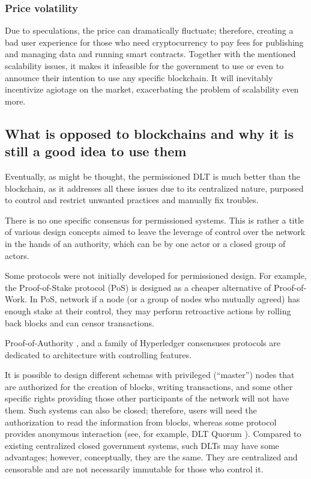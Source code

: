 \begin{multicols}{2}
\subsubsection{Price volatility}

Due to speculations, the price can dramatically fluctuate; therefore, creating a bad user experience for those who need cryptocurrency to pay fees for publishing and managing data and running smart contracts. Together with the mentioned scalability issues, it makes it infeasible for the government to use or even to announce their intention to use any specific blockchain. It will inevitably incentivize agiotage on the market, exacerbating the problem of scalability even more.

\subsection{What is opposed to blockchains and why it is still a good idea to use them}

Eventually, as might be thought, the permissioned DLT is much better than the blockchain, as it addresses all these issues due to its centralized nature, purposed to control and restrict unwanted practices and manually fix troubles.

There is no one specific consensus for permissioned systems. This is rather a title of various design concepts aimed to leave the leverage of control over the network in the hands of an authority, which can be by one actor or a closed group of actors.

Some protocols were not initially developed for permissioned design. For example, the Proof-of-Stake protocol (PoS) \cite{art1-key20} is designed as a cheaper alternative of Proof-of-Work. In PoS, network if a node (or a group of nodes who mutually agreed) has enough stake at their control, they may perform retroactive actions by rolling back blocks \cite{art1-key21} and can censor transactions.

Proof-of-Authority \cite{art1-key22}, and a family of Hyperledger consensuses \cite{art1-key23} protocols are dedicated to architecture with controlling features.

It is possible to design different schemas with privileged (“master”) nodes that are authorized for the creation of blocks, writing transactions, and some other specific rights providing those other participants of the network will not have them. Such systems can also be closed; therefore, users will need the authorization to read the information from blocks, whereas some protocol provides anonymous interaction (see, for example, DLT Quorum \cite{art1-key24}). Compared to existing centralized closed government systems, such DLTs may have some advantages; however, conceptually, they are the same. They are centralized and censorable and are not necessarily immutable for those who control it.


\end{multicols}
